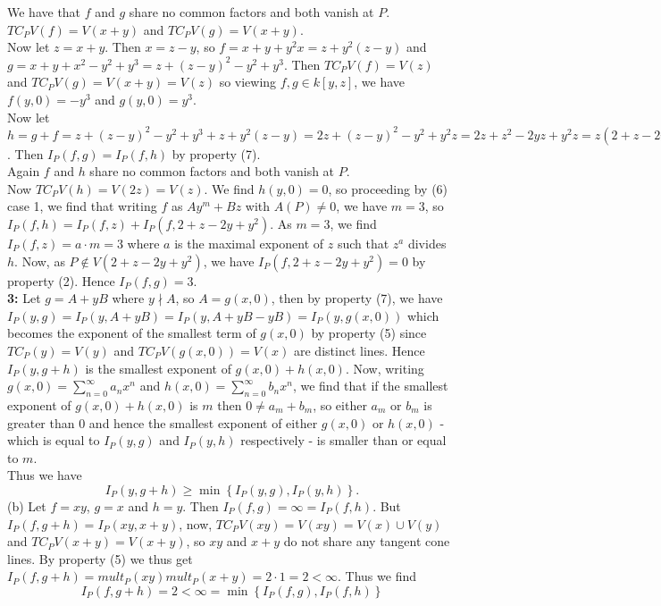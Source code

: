 \documentclass[a4paper]{article}
\begin{document}
   We have that $f$ and $g$ share no common factors and both vanish at $P$.\\
   $TC_P V(f) = V(x+y)$ and $TC_P V(g) = V(x+y)$.\\
   Now let $z = x+y$. Then $x = z-y$, so
   $f = x+y + y^2 x = z + y^2 (z-y)$ and
   $g = x+y+x^2 - y^2 +y^3 = z + (z-y)^2 - y^2 + y^3$. Then
   $TC_P V(f) = V(z)$ and $TC_P V(g) = V(x+y) = V(z)$ so
    viewing $f,g \in k\left[ y,z \right] $, we have
    $f(y,0) = -y^3$ and $g(y,0) =  y^3$.\\
    \linebreak
    Now let $h = g+f = z + (z-y)^2 - y^2 + y^3 + z + y^2 (z-y)
    = 2z + (z-y)^2 - y^2 + y^2z
    = 2z + z^2 - 2yz + y^2 z = z \left( 2 + z - 2y + y^2 \right) $. Then
    $I_P (f,g) = I_P(f,h)$ by property (7).\\
    Again $f$ and $h$ share no common factors and both vanish at $P$.\\
    Now $TC_P V(h) = V(2z) = V(z)$. We find
    $h(y,0) = 0$, so proceeding by (6) case 1, we find
    that writing  $f$ as $Ay^{m} + Bz$ with $A(P) \neq 0$,
    we have $m = 3$, so
    $I_P (f,h) = I_P(f, z) + I_P(f, 2+z-2y + y^2)$. As $m=3$, we
    find $I_P(f,z) = a\cdot m = 3$ where $a$ is the maximal exponent of  $z$ 
    such that $z^{a}$ divides $h$. Now, as 
    $P \not\in V(2 + z - 2y +y^2)$, we have
    $I_P\left( f, 2+z-2y + y^2 \right) = 0$ by property (2). Hence
    $I_P(f,g) = 3$.\\
    \linebreak
    \textbf{3:} Let $g = A + yB$ where $y \nmid A$, so $A = g(x,0)$, then by
    property (7), we have $I_P (y,g) = 
    I_P (y, A+ yB) = I_P(y, A + yB - yB) =I_P (y,g(x,0)) $ which
    becomes the exponent of  the smallest term of $g(x,0)$ by property (5)
    since
    $TC_P(y) = V(y)$ and $TC_P V(g(x,0)) = V(x)$ are distinct lines. Hence
    $I_P(y,g+h)$ is the smallest exponent of
    $g(x,0) + h(x,0)$. Now, writing
    $g(x,0) = \sum_{n=0}^{\infty} a_n x^{n} $ and
    $h(x,0) = \sum_{n=0}^{\infty} b_n x^{n}$, we find that if
    the smallest exponent of $g(x,0) + h(x,0)$ is $m$ then
    $0 \neq a_m + b_m$, so either $a_m$ or $b_m$ is greater than $0$ and
    hence the smallest exponent of either $g(x,0)$ or
    $h(x,0)$ - which is equal to $I_P(y,g)$ and $I_P(y,h)$ respectively -
    is smaller than or equal to $m$.\\
    Thus we have
    \[
    I_P(y, g+h) \ge \min \left\{ I_P(y,g), I_P(y,h) \right\}.
    \] 
    (b) Let  $f = xy$, $g = x$ and $h = y$. Then
    $I_P(f,g) = \infty = I_P(f,h)$. But
    $I_P(f, g+h) = I_P(xy, x+y)$, now,
    $TC_P V(xy) = V(xy) = V(x) \cup V(y)$ and
    $TC_P V(x+y) = V(x+y)$, so  $xy$ and $x+y$ do not share any 
    tangent cone lines. By property (5) we thus get
    $I_P(f,g+h) = mult_P(xy) mult_P(x+y) = 2 \cdot 1 = 2 < \infty$.
    Thus we find
    \[
    I_P (f,g+h) = 2 < \infty = \min \left\{ I_P(f,g), I_P(f,h) \right\} 
    \] 
\end{document}
